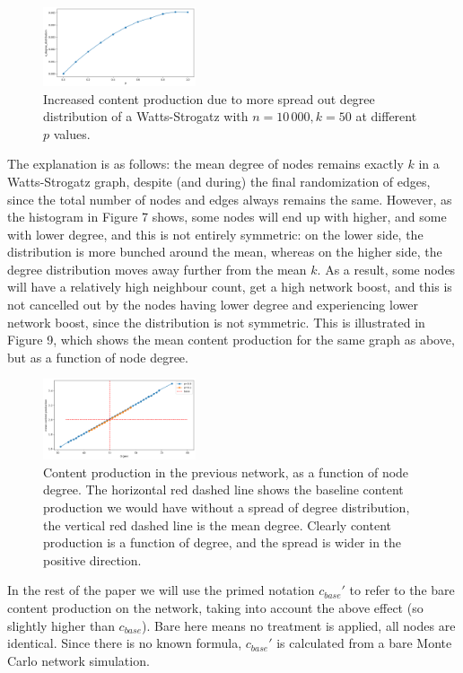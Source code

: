 \documentclass[final,5p,times,twocolumn,authoryear]{elsarticle}
\begin{document}
\begin{figure}[h]
	\centering 
	\includegraphics[width=0.4\textwidth]{figure-8.png}	
	\caption{Increased content production due to more spread out degree distribution of a Watts-Strogatz with $n=10\,000, k=50$ at different $p$ values.} 
\end{figure}

The explanation is as follows: the mean degree of nodes remains exactly $k$ in a Watts-Strogatz graph, despite (and during) the final randomization of edges, since the total number of nodes and edges always remains the same. However, as the histogram in Figure 7 shows, some nodes will end up with higher, and some with lower degree, and this is not entirely symmetric: on the lower side, the distribution is more bunched around the mean, whereas on the higher side, the degree distribution moves away further from the mean $k$. As a result, some nodes will have a relatively high neighbour count, get a high network boost, and this is not cancelled out by the nodes having lower degree and experiencing lower network boost, since the distribution is not symmetric. This is illustrated in Figure 9, which shows the mean content production for the same graph as above, but as a function of node degree.

\begin{figure}[h]
	\centering 
	\includegraphics[width=0.4\textwidth]{figure-9.png}	
	\caption{Content production in the previous network, as a function of node degree. The horizontal red dashed line shows the baseline content production we would have without a spread of degree distribution, the vertical red dashed line is the mean degree. Clearly content production is a function of degree, and the spread is wider in the positive direction.} 
\end{figure}

In the rest of the paper we will use the primed notation $c_{base}\prime$ to refer to the bare content production on the network, taking into account the above effect (so slightly higher than $c_{base}$). Bare here means no treatment is applied, all nodes are identical. Since there is no known formula, $c_{base}\prime$ is calculated from a bare Monte Carlo network simulation.
\end{document}
